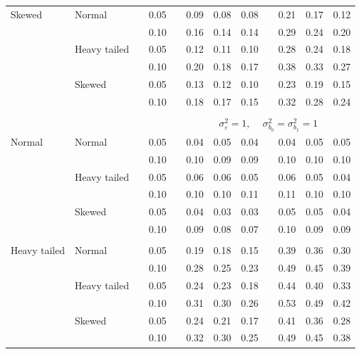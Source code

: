 \documentclass[12pt]{article} %
\begin{document}
\begin{table}[ht]
\begin{scriptsize}
\begin{center}
\begin{tabular}{ll p{.1cm} c p{.1cm} rrr p{.1cm} rrr}
Skewed       & Normal       && 0.05 &&   0.09 & 0.08 & 0.08 && 0.21 & 0.17 & 0.12 \\ 
             &              && 0.10 &&   0.16 & 0.14 & 0.14 && 0.29 & 0.24 & 0.20 \\ 
             & Heavy tailed && 0.05 &&   0.12 & 0.11 & 0.10 && 0.28 & 0.24 & 0.18 \\ 
             &              && 0.10 &&   0.20 & 0.18 & 0.17 && 0.38 & 0.33 & 0.27 \\ 
             & Skewed       && 0.05 &&   0.13 & 0.12 & 0.10 && 0.23 & 0.19 & 0.15 \\ 
             &              && 0.10 &&   0.18 & 0.17 & 0.15 && 0.32 & 0.28 & 0.24 \\ 

&&&&&&&&&&&\\
& && && \multicolumn{7}{c}{$\sigma_{\varepsilon}^2 = 1$, \ \ $\sigma_{b_0}^2 = \sigma_{b_1}^2 = 1$} \\ \cline{6-12}
\rowcolor{gray!20}Normal       & Normal       && 0.05 &&   0.04 & 0.05 & 0.04 && 0.04 & 0.05 & 0.05 \\ 
\rowcolor{gray!20}             &              && 0.10 &&   0.10 & 0.09 & 0.09 && 0.10 & 0.10 & 0.10 \\ 
\rowcolor{gray!20}             & Heavy tailed && 0.05 &&   0.06 & 0.06 & 0.05 && 0.06 & 0.05 & 0.04 \\ 
\rowcolor{gray!20}             &              && 0.10 &&   0.10 & 0.10 & 0.11 && 0.11 & 0.10 & 0.10 \\ 
\rowcolor{gray!20}             & Skewed       && 0.05 &&   0.04 & 0.03 & 0.03 && 0.05 & 0.05 & 0.04 \\ 
\rowcolor{gray!20}             &              && 0.10 &&   0.09 & 0.08 & 0.07 && 0.10 & 0.09 & 0.09 \\ 
             &&&&&&&&&&&\\
Heavy tailed & Normal       && 0.05 &&   0.19 & 0.18 & 0.15 && 0.39 & 0.36 & 0.30 \\ 
             &              && 0.10 &&   0.28 & 0.25 & 0.23 && 0.49 & 0.45 & 0.39 \\ 
             & Heavy tailed && 0.05 &&   0.24 & 0.23 & 0.18 && 0.44 & 0.40 & 0.33 \\ 
             &              && 0.10 &&   0.31 & 0.30 & 0.26 && 0.53 & 0.49 & 0.42 \\ 
             & Skewed       && 0.05 &&   0.24 & 0.21 & 0.17 && 0.41 & 0.36 & 0.28 \\ 
             &              && 0.10 &&   0.32 & 0.30 & 0.25 && 0.49 & 0.45 & 0.38 \\ 

\end{tabular}
\end{center}
\end{scriptsize}
\end{table}
\end{document}
